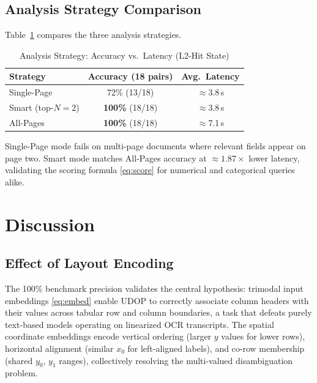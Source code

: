 \documentclass[conference]{IEEEtran}
\begin{document}
\subsection{Analysis Strategy Comparison}

Table~\ref{tab:strategy} compares the three analysis strategies.

\begin{table}[t]
\caption{Analysis Strategy: Accuracy vs.\ Latency (L2-Hit State)}
\label{tab:strategy}
\begin{center}
\renewcommand{\arraystretch}{1.2}
\begin{tabular}{|l|c|c|}
\hline
\textbf{Strategy} & \textbf{Accuracy (18 pairs)} & \textbf{Avg.\ Latency} \\
\hline
Single-Page       & 72\% (13/18) & ${\approx}$3.8\,s \\
Smart (top-$N{=}2$) & \textbf{100\%} (18/18) & ${\approx}$3.8\,s \\
All-Pages           & \textbf{100\%} (18/18) & ${\approx}$7.1\,s \\
\hline
\end{tabular}
\end{center}
\end{table}

Single-Page mode fails on multi-page documents where relevant fields appear on
page two. Smart mode matches All-Pages accuracy at ${\approx}1.87\times$ lower
latency, validating the scoring formula \eqref{eq:score} for numerical and
categorical queries alike.

\section{Discussion}
\label{sec:discussion}

\subsection{Effect of Layout Encoding}

The 100\% benchmark precision validates the central hypothesis: trimodal
input embeddings \eqref{eq:embed} enable UDOP to correctly associate
column headers with their values across tabular row and column boundaries,
a task that defeats purely text-based models operating on linearized OCR
transcripts. The spatial coordinate embeddings encode vertical ordering
(larger $y$ values for lower rows), horizontal alignment (similar $x_0$
for left-aligned labels), and co-row membership (shared $y_0$, $y_1$
ranges), collectively resolving the multi-valued disambiguation problem.
\end{document}
